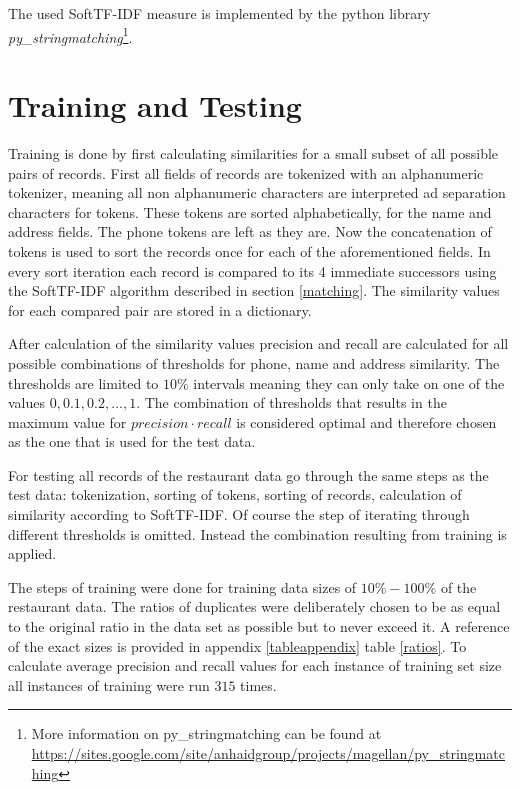\documentclass[conference]{IEEEtran}
\begin{document}
The used SoftTF-IDF measure is implemented by the python library \emph{py\_stringmatching}\footnote{More information on py\_stringmatching  can be found at \url{https://sites.google.com/site/anhaidgroup/projects/magellan/py\_stringmatching}}.

\section{Training and Testing}\label{training}
Training is done by first calculating similarities for a small subset of all possible pairs of records. First all fields of records are tokenized with an alphanumeric tokenizer, meaning all non alphanumeric characters are interpreted ad separation characters for tokens. These tokens are sorted alphabetically, for the name and address fields. The phone tokens are left as they are. Now the concatenation of tokens is used to sort the records once for each of the aforementioned fields. In every sort iteration each record is compared to its 4 immediate successors using the SoftTF-IDF algorithm described in section \ref{matching}. The similarity values for each compared pair are stored in a dictionary.

After calculation of the similarity values precision and recall are calculated for all possible combinations of thresholds for phone, name and address similarity. The thresholds are limited to $10\%$ intervals meaning they can only take on one of the values $0, 0.1, 0.2, \dots, 1$.
The combination of thresholds that results in the maximum value for $precision \cdot recall$ is considered optimal and therefore chosen as the one that is used for the test data.

For testing all records of the restaurant data go through the same steps as the test data: tokenization, sorting of tokens, sorting of records, calculation of similarity according to SoftTF-IDF. Of course the step of iterating through different thresholds is omitted. Instead the combination resulting from training is applied. 

The steps of training were done for training data sizes of $ 10\% - 100\%$ of the restaurant data. The ratios of duplicates were deliberately chosen to be as equal to the original ratio in the data set as possible but to never exceed it. A reference of the exact sizes is provided in appendix \ref{tableappendix} table \ref{ratios}. To calculate average precision and recall values for each instance of training set size all instances of training were run $315$ times.
\end{document}
